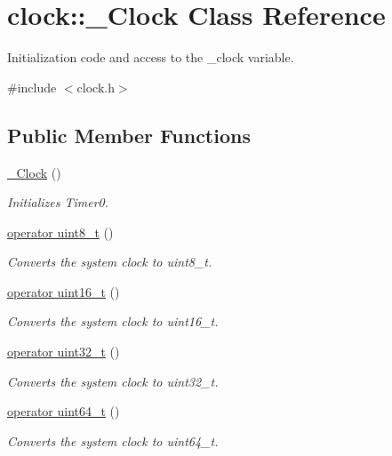 \hypertarget{classclock_1_1__Clock}{}\section{clock\+:\+:\+\_\+\+Clock Class Reference}
\label{classclock_1_1__Clock}


Initialization code and access to the \+\_\+clock variable.  




{\ttfamily \#include $<$clock.\+h$>$}

\subsection*{Public Member Functions}
\begin{DoxyCompactItemize}
\item 
\hyperlink{classclock_1_1__Clock_a6b87c9f7ce1d1b0de9a5e728a62342ce}{\+\_\+\+Clock} ()
\begin{DoxyCompactList}\small\item\em Initializes {\ttfamily Timer0}. \end{DoxyCompactList}\item 
\hyperlink{classclock_1_1__Clock_ab095ca7d0ca8668e5904afb9998133f7}{operator uint8\+\_\+t} ()
\begin{DoxyCompactList}\small\item\em Converts the system clock to {\ttfamily uint8\+\_\+t}. \end{DoxyCompactList}\item 
\hyperlink{classclock_1_1__Clock_adaacf5c86adc29d0e0758197d1727d2e}{operator uint16\+\_\+t} ()
\begin{DoxyCompactList}\small\item\em Converts the system clock to {\ttfamily uint16\+\_\+t}. \end{DoxyCompactList}\item 
\hyperlink{classclock_1_1__Clock_a9eb2b6bbd2a98818df1d379125fd525c}{operator uint32\+\_\+t} ()
\begin{DoxyCompactList}\small\item\em Converts the system clock to {\ttfamily uint32\+\_\+t}. \end{DoxyCompactList}\item 
\hyperlink{classclock_1_1__Clock_a2be32ac8c4e823da6dd966f5d19c7032}{operator uint64\+\_\+t} ()
\begin{DoxyCompactList}\small\item\em Converts the system clock to {\ttfamily uint64\+\_\+t}. \end{DoxyCompactList}\end{DoxyCompactItemize}


